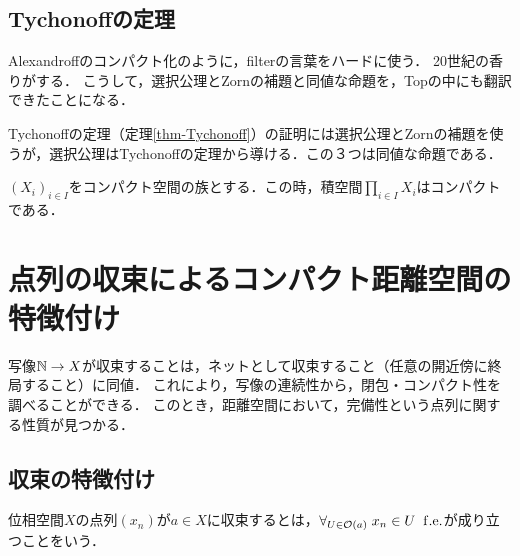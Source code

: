 \documentclass[uplatex,dvipdfmx]{jsreport}
\begin{document}
\subsection{Tychonoffの定理}

\begin{tcolorbox}[colframe=ForestGreen, colback=ForestGreen!10!white, breakable ,colbacktitle=ForestGreen!40!white, coltitle=black,fonttitle=\bfseries\sffamily
    ,title=Tychonoffの定理]
    Alexandroffのコンパクト化のように，filterの言葉をハードに使う．
    20世紀の香りがする．
    こうして，選択公理とZornの補題と同値な命題を，Topの中にも翻訳できたことになる．
\end{tcolorbox}

\begin{remark}
    Tychonoffの定理（定理\ref{thm-Tychonoff}）の証明には選択公理とZornの補題を使うが，選択公理はTychonoffの定理から導ける．この３つは同値な命題である．
\end{remark}

\begin{theorem}[Tychonoff]
    $(X_i)_{i\in I}$をコンパクト空間の族とする．この時，積空間$\prod_{i\in I}X_i$はコンパクトである．
\end{theorem}

\section{点列の収束によるコンパクト距離空間の特徴付け}

\begin{tcolorbox}[colframe=ForestGreen, colback=ForestGreen!10!white,breakable,colbacktitle=ForestGreen!40!white,coltitle=black,fonttitle=\bfseries\sffamily,
title=完備性の発見]
    写像$\mathbb{N}\to X$が収束することは，ネットとして収束すること（任意の開近傍に終局すること）に同値．
    これにより，写像の連続性から，閉包・コンパクト性を調べることができる．
    このとき，距離空間において，完備性という点列に関する性質が見つかる．
\end{tcolorbox}

\subsection{収束の特徴付け}

\begin{definition}
    位相空間$X$の点列$(x_n)$が$a\in X$に収束するとは，$\forall_{U\in\mathcal{O}(a)}\;x_n\in U\;\;\mathrm{f.e.}$が成り立つことをいう．
\end{definition}
\end{document}
